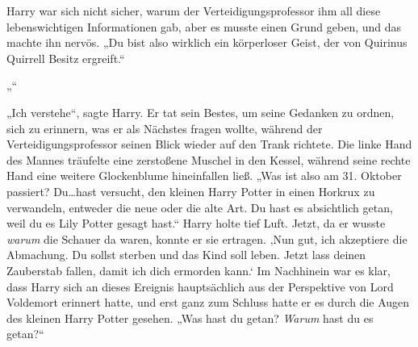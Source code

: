 Harry war sich nicht sicher, warum der Verteidigungsprofessor ihm all diese lebenswichtigen Informationen gab, aber es musste einen Grund geben, und das machte ihn nervös.
„Du bist also wirklich ein körperloser Geist, der von Quirinus Quirrell Besitz ergreift.“

„“

„Ich verstehe“, sagte Harry.
Er tat sein Bestes, um seine Gedanken zu ordnen, sich zu erinnern, was er als Nächstes fragen wollte, während der Verteidigungsprofessor seinen Blick wieder auf den Trank richtete. Die linke Hand des Mannes träufelte eine zerstoßene Muschel in den Kessel, während seine rechte Hand eine weitere Glockenblume hineinfallen ließ.
„Was ist also am 31. Oktober passiert? Du…hast versucht, den kleinen Harry Potter in einen Horkrux zu verwandeln, entweder die neue oder die alte Art. Du hast es absichtlich getan, weil du es Lily Potter gesagt hast.“
Harry holte tief Luft. Jetzt, da er wusste \emph{warum} die Schauer da waren, konnte er sie ertragen.
‚Nun gut, ich akzeptiere die Abmachung. Du sollst sterben und das Kind soll leben. Jetzt lass deinen Zauberstab fallen, damit ich dich ermorden kann.‘
Im Nachhinein war es klar, dass Harry sich an dieses Ereignis hauptsächlich aus der Perspektive von Lord Voldemort erinnert hatte, und erst ganz zum Schluss hatte er es durch die Augen des kleinen Harry Potter gesehen.
„Was hast du getan? \emph{Warum} hast du es getan?“


